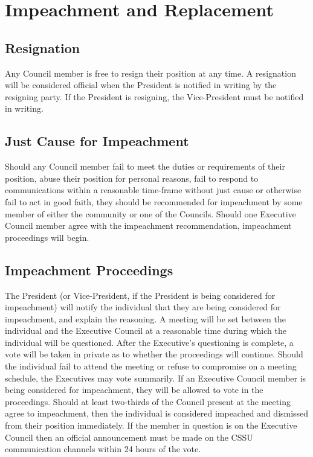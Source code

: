 \documentclass{article}
\begin{document}
\section{Impeachment and Replacement} \label{sec:4}
\subsection{Resignation}  \label{sec:4.1}
Any Council member is free to resign their position at any time. A resignation will be considered official when the President is notified in writing by the resigning party. If the President is resigning, the Vice-President must be notified in writing.
\subsection{Just Cause for Impeachment}  \label{sec:4.2}
Should any Council member fail to meet the duties or requirements of their position, abuse their position for personal reasons, fail to respond to communications within a reasonable time-frame without just cause or otherwise fail to act in good faith, they should be recommended for impeachment by some member of either the community or one of the Councils. Should one Executive Council member agree with the impeachment recommendation, impeachment proceedings will begin.
\subsection{Impeachment Proceedings}  \label{sec:4.3}
The President (or Vice-President, if the President is being considered for impeachment) will notify the individual that they are being considered for impeachment, and explain the reasoning. A meeting will be set between the individual and the Executive Council at a reasonable time during which the individual will be questioned. After the Executive’s questioning is complete, a vote will be taken in private as to whether the proceedings will continue.
Should the individual fail to attend the meeting or refuse to compromise on a meeting schedule, the Executives may vote summarily. If an Executive Council member is being considered for impeachment, they will be allowed to vote in the proceedings. Should at least two-thirds of the Council present at the meeting agree to impeachment, then the individual is considered impeached and dismissed from their position immediately. If the member in question is on the Executive Council then an official announcement must be made on the CSSU communication channels within 24 hours of the vote.
\end{document}
